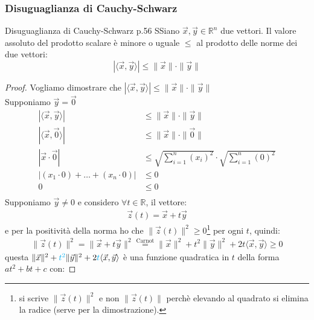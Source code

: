 \documentclass{article}  %
\begin{document}
\subsubsection{Disuguaglianza di Cauchy-Schwarz}
\begin{theorem}{Disuguaglianza di Cauchy-Schwarz p.56}
	SSiano $\vec{x}, \vec{y} \in \mathbb{R}^n$ due vettori. Il valore assoluto del prodotto scalare è minore o uguale $\leq$ al prodotto delle norme dei due vettori:
	\[
		|\langle \vec{x}, \vec{y} \rangle| \leq \|\vec{x}\| \cdot \|\vec{y}\|
	\]
	\begin{proof}
		Vogliamo dimostrare che $|\langle \vec{x}, \vec{y} \rangle| \leq \|\vec{x}\| \cdot \|\vec{y}\|$ \\
		\fbox{\textcolor{red}{Caso 1: $x \lor y = 0$}}
		Supponiamo $\vec{y}=\vec{0}$
		\begin{align*}
			|\langle \vec{x}, \vec{y} \rangle|     & \leq \|\vec{x}\| \cdot \|\vec{y}\|                                 \\
			|\langle \vec{x}, \vec{0} \rangle|     & \leq \|\vec{x}\| \cdot \|\vec{0}\|                                 \\
			|\vec{x} \cdot \vec{0}|                & \leq \sqrt{\sum_{i=1}^{n}(x_i)^2} \cdot \sqrt{\sum_{i=1}^{n}(0)^2} \\
			|(x_1 \cdot 0)+ \dots + (x_n \cdot 0)| & \leq 0                                                             \\
			0                                      & \leq 0                                                             \\
		\end{align*}
		\fbox{\textcolor{red}{Caso 2: $x,y \neq 0$}}
		Supponiamo $\vec{y} \neq 0$ e considero $\forall{t \in \mathbb{R}}$, il vettore:
		\begin{align*}
			\vec{z}(t)=\vec{x}+t\vec{y}
		\end{align*}
		e per la positività della norma ho che $\|\vec{z}(t)\|^2 \geq 0$\footnote{
			si scrive $\|\vec{z}(t)\|^2$ e non $\|\vec{z}(t)\|$ perchè elevando al quadrato si elimina la radice (serve per la dimostrazione).
		} per ogni $t$, quindi:
		\begin{align*}
			\|\vec{z}(t)\|^2 = \|\vec{x}+t\vec{y}\|^2 \overset{\text{Carnot}}{=} \|\vec{x}\|^2 + t^2\|\vec{y}\|^2 + 2t \langle \vec{x}, \vec{y} \rangle \geq 0
		\end{align*}
		questa $\|\vec{x}\|^2 + \textcolor{cyan}{t^2}\|\vec{y}\|^2 + 2 \textcolor{cyan}{t} \langle \vec{x}, \vec{y} \rangle$ è una funzione quadratica in $t$ della forma $at^2+bt+c$ con:

\end{proof}
\end{theorem}
\end{document}

